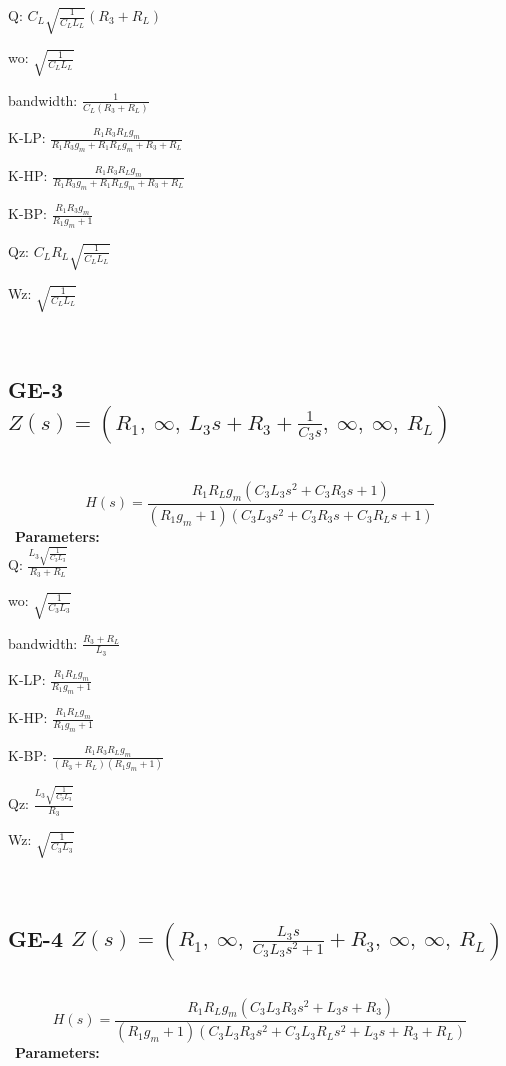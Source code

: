 \documentclass{article}
\begin{document}
Q: $C_{L} \sqrt{\frac{1}{C_{L} L_{L}}} \left(R_{3} + R_{L}\right)$\ 

wo: $\sqrt{\frac{1}{C_{L} L_{L}}}$\ 

bandwidth: $\frac{1}{C_{L} \left(R_{3} + R_{L}\right)}$\ 

K-LP: $\frac{R_{1} R_{3} R_{L} g_{m}}{R_{1} R_{3} g_{m} + R_{1} R_{L} g_{m} + R_{3} + R_{L}}$\ 

K-HP: $\frac{R_{1} R_{3} R_{L} g_{m}}{R_{1} R_{3} g_{m} + R_{1} R_{L} g_{m} + R_{3} + R_{L}}$\ 

K-BP: $\frac{R_{1} R_{3} g_{m}}{R_{1} g_{m} + 1}$\ 

Qz: $C_{L} R_{L} \sqrt{\frac{1}{C_{L} L_{L}}}$\ 

Wz: $\sqrt{\frac{1}{C_{L} L_{L}}}$\ 

\ 

\subsection{GE-3 $Z(s) = \left( R_{1}, \  \infty, \  L_{3} s + R_{3} + \frac{1}{C_{3} s}, \  \infty, \  \infty, \  R_{L}\right)$ } \ 
\textbf{\[H(s) = \frac{R_{1} R_{L} g_{m} \left(C_{3} L_{3} s^{2} + C_{3} R_{3} s + 1\right)}{\left(R_{1} g_{m} + 1\right) \left(C_{3} L_{3} s^{2} + C_{3} R_{3} s + C_{3} R_{L} s + 1\right)}\] } \ 
\textbf{Parameters:}\\ 

Q: $\frac{L_{3} \sqrt{\frac{1}{C_{3} L_{3}}}}{R_{3} + R_{L}}$\ 

wo: $\sqrt{\frac{1}{C_{3} L_{3}}}$\ 

bandwidth: $\frac{R_{3} + R_{L}}{L_{3}}$\ 

K-LP: $\frac{R_{1} R_{L} g_{m}}{R_{1} g_{m} + 1}$\ 

K-HP: $\frac{R_{1} R_{L} g_{m}}{R_{1} g_{m} + 1}$\ 

K-BP: $\frac{R_{1} R_{3} R_{L} g_{m}}{\left(R_{3} + R_{L}\right) \left(R_{1} g_{m} + 1\right)}$\ 

Qz: $\frac{L_{3} \sqrt{\frac{1}{C_{3} L_{3}}}}{R_{3}}$\ 

Wz: $\sqrt{\frac{1}{C_{3} L_{3}}}$\ 

\ 

\subsection{GE-4 $Z(s) = \left( R_{1}, \  \infty, \  \frac{L_{3} s}{C_{3} L_{3} s^{2} + 1} + R_{3}, \  \infty, \  \infty, \  R_{L}\right)$ } \ 
\textbf{\[H(s) = \frac{R_{1} R_{L} g_{m} \left(C_{3} L_{3} R_{3} s^{2} + L_{3} s + R_{3}\right)}{\left(R_{1} g_{m} + 1\right) \left(C_{3} L_{3} R_{3} s^{2} + C_{3} L_{3} R_{L} s^{2} + L_{3} s + R_{3} + R_{L}\right)}\] } \ 
\textbf{Parameters:}\\ 
\end{document}
